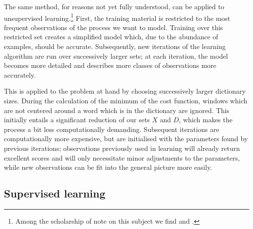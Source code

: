 The same method, for reasons not yet fully understood, can be applied
to unsupervised learning.\footnote{Among the scholarship of note on
  this subject we find \citet{bengio2009curriculum} and
  \citet{erhan2010}.} First, the training material is restricted to the
most frequent observations of the process we want to model. Training
over this restricted set creates a simplified model which, due to the
abundance of examples, should be accurate. Subsequently, new
iterations of the learning algorithm are run over successively larger
sets; at each iteration, the model becomes more detailed and describes
more classes of observations more accurately.

This is applied to the problem at hand by choosing
successively larger dictionary sizes. During the calculation of the
minimum of the cost function, windows which are not centered around a
word which is in the dictionary are ignored. This initially entails a
significant reduction of our sets $X$ and $D$, which makes the process
a bit less computationally demanding. Subsequent iterations are
computationally more expensive, but are initialised with the
parameters found by previous iterations; observations previously used
in learning will already return excellent scores and will only
necessitate minor adjustments to the parameters, while new
observations can be fit into the general picture more easily.



\subsection{Supervised learning}
\label{sec:supervised}

